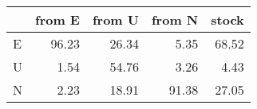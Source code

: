 \begin{tabular}{lrrrr}
\toprule
{} &  from E &  from U &  from N &  stock \\
\midrule
E &   96.23 &   26.34 &    5.35 &  68.52 \\
U &    1.54 &   54.76 &    3.26 &   4.43 \\
N &    2.23 &   18.91 &   91.38 &  27.05 \\
\bottomrule
\end{tabular}
